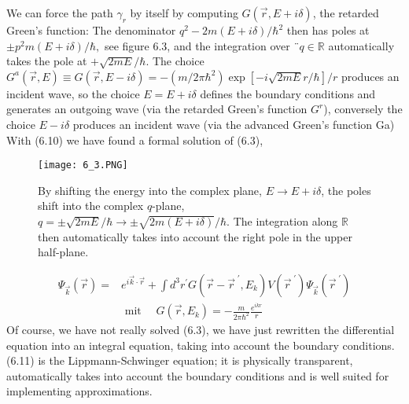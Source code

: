We can force the path $\gamma_r$ by itself by computing $G (\vec{r}, E + i\delta)$, the retarded Green's function: The denominator $q^2-2m (E + i\delta) / \hbar^2$ then has poles at $\pm p^2m (E + i\delta) / \hbar,$ see figure 6.3, and the integration over $¨ q \in \mathbb{R}$ automatically takes the pole at $+ \sqrt{2mE} / \hbar$. The choice $G^a (\vec{r}, E) \equiv G (\vec{r}, E - i\delta) = - (m / 2\pi\hbar^2)\operatorname{exp}[-i\sqrt{2mE}r/\hbar]/r$ produces an incident wave, so the choice $E = E + i\delta$ defines the boundary conditions and generates an outgoing wave (via the retarded Green's function $G^r$), conversely the choice $E - i\delta$ produces an incident wave (via the advanced Green's function Ga) With (6.10) we have found a formal solution of (6.3),
\begin{figure}[ht]
    \begin{minipage}{0.5\textwidth}
        \centering
        \texttt{[image: 6\_3.PNG]}
    \end{minipage}
    \begin{minipage}{0.5\textwidth}
        \caption{By shifting the energy into the complex plane, $E\rightarrow E+i\delta$, the poles shift into the complex $q$-plane, $q=\pm\sqrt{2mE}/\hbar\rightarrow\pm \sqrt{2m(E+i\delta)}/\hbar$. The integration along $\mathbb{R}$ then automatically takes into account the right pole in the upper half-plane.}
    \end{minipage}
\end{figure}
\begin{equation}
\begin{aligned} \Psi_{\vec{k}}(\vec{r})=& e^{i \vec{k} \cdot \vec{r}}+\int d^{3} r^{\prime} G\left(\vec{r}-\vec{r}^{\;\prime}, E_{k}\right) V\left(\vec{r}^{\;\prime}\right) \Psi_{\vec{k}}\left(\vec{r}^{\;\prime}\right) \\ & \text { mit } \quad G\left(\vec{r}, E_{k}\right)=-\frac{m}{2 \pi \hbar^{2}} \frac{e^{i k r}}{r} \end{aligned}
\end{equation}
Of course, we have not really solved (6.3), we have just rewritten the differential equation into an integral equation, taking into account the boundary conditions. (6.11) is the Lippmann-Schwinger equation; it is physically transparent, automatically takes into account the boundary conditions and is well suited for implementing approximations.

